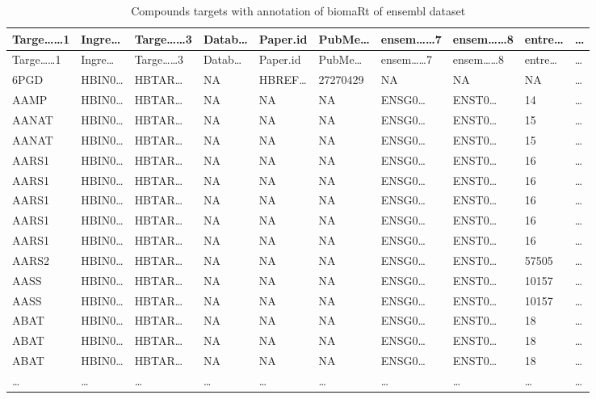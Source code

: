 \documentclass[
]{article}
\begin{document}
\begin{longtable}[]{@{}llllllllll@{}}
\caption{\label{tab:compounds-targets-with-annotation-of-biomaRt-of-ensembl-dataset}Compounds targets with annotation of biomaRt of ensembl dataset}\tabularnewline
\toprule
Targe\ldots\ldots1 & Ingre\ldots{} & Targe\ldots\ldots3 & Datab\ldots{} & Paper.id & PubMe\ldots{} & ensem\ldots\ldots7 & ensem\ldots\ldots8 & entre\ldots{} & \ldots{}\tabularnewline
\midrule
\endfirsthead
\toprule
Targe\ldots\ldots1 & Ingre\ldots{} & Targe\ldots\ldots3 & Datab\ldots{} & Paper.id & PubMe\ldots{} & ensem\ldots\ldots7 & ensem\ldots\ldots8 & entre\ldots{} & \ldots{}\tabularnewline
\midrule
\endhead
6PGD & HBIN0\ldots{} & HBTAR\ldots{} & NA & HBREF\ldots{} & 27270429 & NA & NA & NA & \ldots{}\tabularnewline
AAMP & HBIN0\ldots{} & HBTAR\ldots{} & NA & NA & NA & ENSG0\ldots{} & ENST0\ldots{} & 14 & \ldots{}\tabularnewline
AANAT & HBIN0\ldots{} & HBTAR\ldots{} & NA & NA & NA & ENSG0\ldots{} & ENST0\ldots{} & 15 & \ldots{}\tabularnewline
AANAT & HBIN0\ldots{} & HBTAR\ldots{} & NA & NA & NA & ENSG0\ldots{} & ENST0\ldots{} & 15 & \ldots{}\tabularnewline
AARS1 & HBIN0\ldots{} & HBTAR\ldots{} & NA & NA & NA & ENSG0\ldots{} & ENST0\ldots{} & 16 & \ldots{}\tabularnewline
AARS1 & HBIN0\ldots{} & HBTAR\ldots{} & NA & NA & NA & ENSG0\ldots{} & ENST0\ldots{} & 16 & \ldots{}\tabularnewline
AARS1 & HBIN0\ldots{} & HBTAR\ldots{} & NA & NA & NA & ENSG0\ldots{} & ENST0\ldots{} & 16 & \ldots{}\tabularnewline
AARS1 & HBIN0\ldots{} & HBTAR\ldots{} & NA & NA & NA & ENSG0\ldots{} & ENST0\ldots{} & 16 & \ldots{}\tabularnewline
AARS1 & HBIN0\ldots{} & HBTAR\ldots{} & NA & NA & NA & ENSG0\ldots{} & ENST0\ldots{} & 16 & \ldots{}\tabularnewline
AARS2 & HBIN0\ldots{} & HBTAR\ldots{} & NA & NA & NA & ENSG0\ldots{} & ENST0\ldots{} & 57505 & \ldots{}\tabularnewline
AASS & HBIN0\ldots{} & HBTAR\ldots{} & NA & NA & NA & ENSG0\ldots{} & ENST0\ldots{} & 10157 & \ldots{}\tabularnewline
AASS & HBIN0\ldots{} & HBTAR\ldots{} & NA & NA & NA & ENSG0\ldots{} & ENST0\ldots{} & 10157 & \ldots{}\tabularnewline
ABAT & HBIN0\ldots{} & HBTAR\ldots{} & NA & NA & NA & ENSG0\ldots{} & ENST0\ldots{} & 18 & \ldots{}\tabularnewline
ABAT & HBIN0\ldots{} & HBTAR\ldots{} & NA & NA & NA & ENSG0\ldots{} & ENST0\ldots{} & 18 & \ldots{}\tabularnewline
ABAT & HBIN0\ldots{} & HBTAR\ldots{} & NA & NA & NA & ENSG0\ldots{} & ENST0\ldots{} & 18 & \ldots{}\tabularnewline
\ldots{} & \ldots{} & \ldots{} & \ldots{} & \ldots{} & \ldots{} & \ldots{} & \ldots{} & \ldots{} & \ldots{}\tabularnewline
\bottomrule
\end{longtable}
\end{document}
